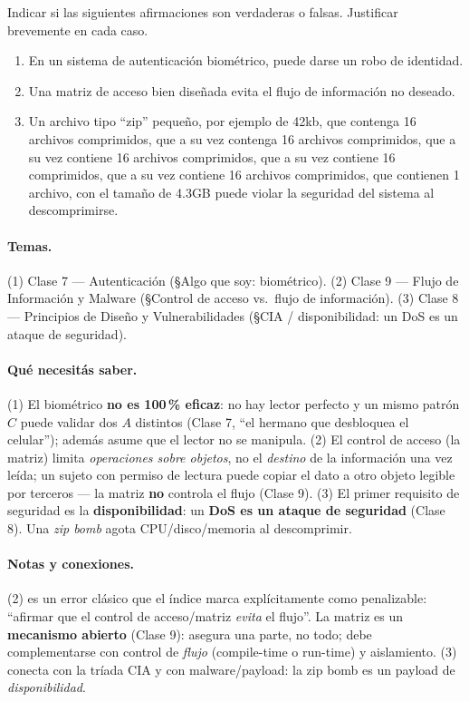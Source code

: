 \begin{consigna}
Indicar si las siguientes afirmaciones son verdaderas o falsas. Justificar brevemente en cada
caso.
\begin{enumerate}[label=(\arabic*)]
  \item En un sistema de autenticación biométrico, puede darse un robo de identidad.
  \item Una matriz de acceso bien diseñada evita el flujo de información no deseado.
  \item Un archivo tipo ``zip'' pequeño, por ejemplo de 42kb, que contenga 16 archivos
        comprimidos, que a su vez contenga 16 archivos comprimidos, que a su vez contiene 16
        archivos comprimidos, que a su vez contiene 16 comprimidos, que a su vez contiene 16
        archivos comprimidos, que contienen 1 archivo, con el tamaño de 4.3GB puede violar la
        seguridad del sistema al descomprimirse.
\end{enumerate}
\end{consigna}

\paragraph{Temas.}
(1) Clase 7 — Autenticación (\S Algo que soy: biométrico). (2) Clase 9 — Flujo de Información y
Malware (\S Control de acceso vs.\ flujo de información). (3) Clase 8 — Principios de Diseño y
Vulnerabilidades (\S CIA / disponibilidad: un DoS es un ataque de seguridad).

\paragraph{Qué necesitás saber.}
(1) El biométrico \textbf{no es 100\,\% eficaz}: no hay lector perfecto y un mismo patrón $C$
puede validar dos $A$ distintos (Clase 7, ``el hermano que desbloquea el celular''); además asume
que el lector no se manipula. (2) El control de acceso (la matriz) limita \emph{operaciones sobre
objetos}, no el \emph{destino} de la información una vez leída; un sujeto con permiso de lectura
puede copiar el dato a otro objeto legible por terceros --- la matriz \textbf{no} controla el
flujo (Clase 9). (3) El primer requisito de seguridad es la \textbf{disponibilidad}: un
\textbf{DoS es un ataque de seguridad} (Clase 8). Una \emph{zip bomb} agota CPU/disco/memoria al
descomprimir.

\paragraph{Notas y conexiones.}
(2) es un error clásico que el índice marca explícitamente como penalizable: ``afirmar que el
control de acceso/matriz \emph{evita} el flujo''. La matriz es un \textbf{mecanismo abierto}
(Clase 9): asegura una parte, no todo; debe complementarse con control de \emph{flujo}
(compile-time o run-time) y aislamiento. (3) conecta con la tríada CIA y con malware/payload: la
zip bomb es un payload de \emph{disponibilidad}.

